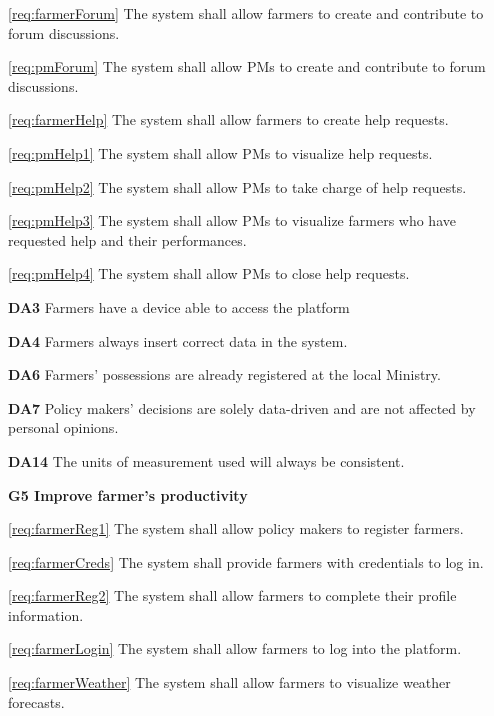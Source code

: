 \documentclass[10pt]{article}
\begin{document}
\begin{description}
\begin{description}
            \item \ref{req:farmerForum} The system shall allow farmers to create and contribute to forum discussions.
            \item \ref{req:pmForum} The system shall allow PMs to create and contribute to forum discussions.
            \item \ref{req:farmerHelp} The system shall allow farmers to create help requests. %
            \item \ref{req:pmHelp1} The system shall allow PMs to visualize help requests.%
            \item \ref{req:pmHelp2} The system shall allow PMs to take charge of help requests.%
            \item \ref{req:pmHelp3} The system shall allow PMs to visualize farmers who have requested help and their performances.%
            \item \ref{req:pmHelp4} The system shall allow PMs to close help requests.%
            \item \textbf{DA3} Farmers have a device able to access the platform
            \item \textbf{DA4} Farmers always insert correct data in the system.
            \item \textbf{DA6} Farmers' possessions are already registered at the local Ministry.
            \item \textbf{DA7} Policy makers' decisions are solely data-driven and are not affected by personal opinions.
            \item \textbf{DA14} The units of measurement used will always be consistent. 
        \end{description}
        \item \textbf{G5 Improve farmer's productivity}
        \begin{description}
            \item \ref{req:farmerReg1} The system shall allow policy makers to register farmers.    
            \item \ref{req:farmerCreds} The system shall provide farmers with credentials to log in.    
            \item \ref{req:farmerReg2} The system shall allow farmers to complete their profile information.    
            \item \ref{req:farmerLogin} The system shall allow farmers to log into the platform.
            \item \ref{req:farmerWeather} The system shall allow farmers to visualize weather forecasts.

\end{description}
\end{description}
\end{document}
